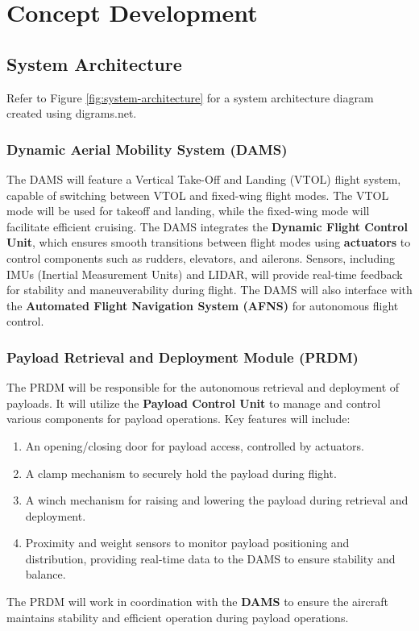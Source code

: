 \documentclass[12pt]{article}
\begin{document}
\section{Concept Development}
\subsection{System Architecture}

Refer to Figure \ref{fig:system-architecture} for a system architecture diagram created using digrams.net.

\subsubsection{Dynamic Aerial Mobility System (DAMS)}
The DAMS will feature a Vertical Take-Off and Landing (VTOL) flight system, capable of switching between VTOL and fixed-wing flight modes. The VTOL mode will be used for takeoff and landing, while the fixed-wing mode will facilitate efficient cruising. The DAMS integrates the \textbf{Dynamic Flight Control Unit}, which ensures smooth transitions between flight modes using \textbf{actuators} to control components such as rudders, elevators, and ailerons. Sensors, including IMUs (Inertial Measurement Units) and LIDAR, will provide real-time feedback for stability and maneuverability during flight. The DAMS will also interface with the \textbf{Automated Flight Navigation System (AFNS)} for autonomous flight control.

\subsubsection{Payload Retrieval and Deployment Module (PRDM)}
The PRDM will be responsible for the autonomous retrieval and deployment of payloads. It will utilize the \textbf{Payload Control Unit} to manage and control various components for payload operations. Key features will include:
\begin{enumerate}
    \item An opening/closing door for payload access, controlled by actuators.
    \item A clamp mechanism to securely hold the payload during flight.
    \item A winch mechanism for raising and lowering the payload during retrieval and deployment.
    \item Proximity and weight sensors to monitor payload positioning and distribution, providing real-time data to the DAMS to ensure stability and balance.
\end{enumerate}
The PRDM will work in coordination with the \textbf{DAMS} to ensure the aircraft maintains stability and efficient operation during payload operations.
\end{document}
